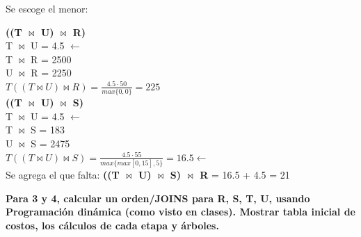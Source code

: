 \documentclass{templateNote}
\begin{document}
\begin{enumerate}
    Se escoge el menor:

    \textbf{((T $\Join$ U) $\Join$ R)}\\
        T $\Join$ U = 4.5 $\leftarrow$\\
        T $\Join$ R = 2500 \\
        U $\Join$ R = 2250 \\
        $T((T \Join U) \Join R) = \frac{4.5\cdot50}{max\{0,0\}} = 225$\\

    \textbf{((T $\Join$ U) $\Join$ S)} \\
        T $\Join$ U = 4.5 $\leftarrow$\\
        T $\Join$ S = 183 \\
        U $\Join$ S = 2475 \\
        $T((T \Join U) \Join S) = \frac{4.5\cdot55}{max\{max[0,15],5\}} = 16.5 \leftarrow$\\ 

    Se agrega el que falta:
    \textbf{((T $\Join$ U) $\Join$ S) $\Join$ R} = 16.5 + 4.5 = 21

    \begin{center}
    \end{center}

\end{enumerate}

\newpage
\begin{tcolorbox}
    \textbf{Para 3 y 4, calcular un orden/JOINS para R, S, T, U, usando Programación dinámica (como visto en clases). Mostrar tabla inicial de costos, los cálculos de cada etapa y árboles.}
\end{tcolorbox}
    
\end{document}
